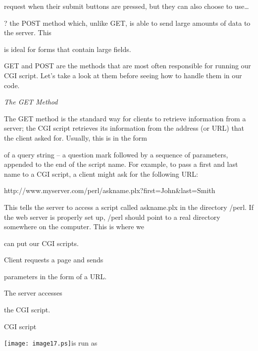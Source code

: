 \documentclass[a4paper,11pt]{book}
\begin{document}
\noindent request when their submit buttons are pressed, but they can also choose to use\dots 

\noindent ? the POST method which, unlike GET, is able to send large amounts of data to the server. This

\noindent is ideal for forms that contain large fields.

\noindent 

\noindent GET and POST are the methods that are most often responsible for running our CGI script. Let's take a look at them before seeing how to handle them in our code.

\noindent 

\noindent \textit{The GET Method}

\noindent The GET method is the standard way for clients to retrieve information from a server; the CGI script retrieves its information from the address (or URL) that the client asked for. Usually, this is in the form

\noindent of a query string -- a question mark followed by a sequence of parameters, appended to the end of the script name. For example, to pass a first and last name to a CGI script, a client might ask for the following URL:

\noindent 

\noindent http://www.myserver.com/perl/askname.plx?first=John\&last=Smith

\noindent 

\noindent This tells the server to access a script called askname.plx in the directory /perl. If the web server is properly set up, /perl should point to a real directory somewhere on the computer. This is where we

\noindent can put our CGI scripts.

\noindent 

\noindent 

\noindent 

    Client requests a page and sends

\noindent parameters in the form of a URL.

     The server accesses

\noindent the CGI script.

\noindent 

\noindent 

\noindent 

\noindent 

    CGI script

\noindent \texttt{[image: image17.ps]}is run as
\end{document}

